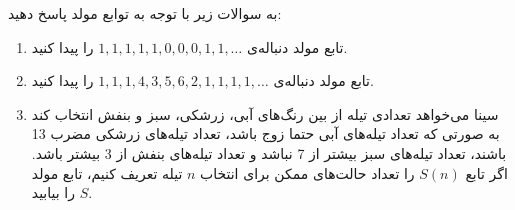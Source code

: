     \p
    به سوالات زیر با توجه به توابع مولد پاسخ دهید:
        \begin{enumerate}
            \item 
                تابع مولد دنباله‌ی 
                ${1,1,1,1,1,0,0,0,1,1,\ldots}$
                را پیدا کنید.
            \item
                تابع مولد دنباله‌ی
                ${1,1,1,4,3,5,6,2,1,1,1,1,\ldots}$
                را پیدا کنید.
            \item 
                سینا می‌خواهد تعدادی تیله از بین رنگ‌های آبی، زرشکی، سبز و بنفش انتخاب کند به صورتی که تعداد تیله‌های آبی حتما زوج باشد، تعداد تیله‌های زرشکی مضرب 13 باشند، تعداد تیله‌های سبز بیشتر از 7 نباشد و تعداد تیله‌های بنفش از 3 بیشتر باشد. اگر تابع $S(n)$ را تعداد حالت‌های ممکن برای انتخاب $n$ تیله تعریف کنیم، تابع مولد $S$ را بیابید.
        \end{enumerate}
